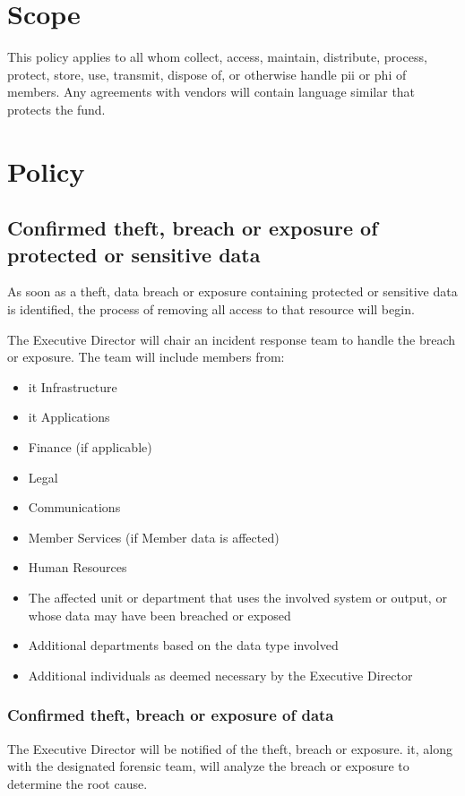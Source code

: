 \section{Scope}
This policy applies to all whom collect, access, maintain, distribute, process, protect, store, use, transmit, dispose of, or otherwise handle \gls{pii} or \gls{phi} of \OrganizationName{} members.  
Any agreements with vendors will contain language similar that protects the fund.

\section{Policy}
\subsection{Confirmed theft, breach\oxford{} or exposure of \OrganizationName{} protected or sensitive data}
As soon as a theft, data breach\oxford{} or exposure containing \OrganizationName{} protected or \del{\OrganizationName{} }sensitive data is identified, the process of removing all access to that resource will begin.

The Executive Director will chair an incident response team to handle the breach or exposure.  
The team will include members from:
\begin{itemize}
\item
\gls{it} Infrastructure
\item
\gls{it} Applications
\item
Finance (if applicable)
\item
Legal
\item
Communications
\item
Member Services (if Member data is affected)
\item
Human Resources
\item
The affected unit or department that uses the involved system or output, or whose data may have been breached or exposed
\item
Additional departments based on the data type involved
\item
Additional individuals as deemed necessary by the Executive Director
\end{itemize}

\subsubsection{Confirmed theft, breach\oxford{} or exposure of \OrganizationName{} data}
The Executive Director will be notified of the theft,  breach\oxford{} or exposure.  
\gls{it}, along with the designated forensic team, will analyze the breach or exposure to determine the root cause.  

